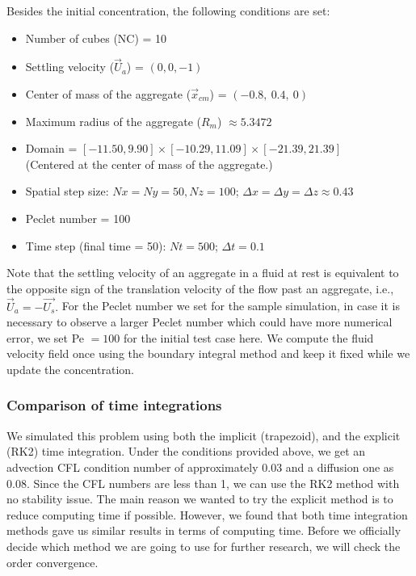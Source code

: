 Besides the initial concentration, the following conditions are set:
\begin{framed}
\begin{itemize}
	\item Number of cubes (NC) = 10
	\item Settling velocity ($\vec{U}_a$) = $(0,0,-1)$
	\item Center of mass of the aggregate ($\vec{x}_{cm}$) = $(-0.8, \  0.4, \ 0)$
	\item Maximum radius of the aggregate ($R_m$) $\approx 5.3472$
	\item Domain = $[-11.50, 9.90] \times [-10.29, 11.09] \times [-21.39, 21.39]$\\
	(Centered at the center of mass of the aggregate.)
	\item Spatial step size: $Nx = Ny = 50, Nz = 100$; $\Delta x = \Delta y = \Delta z \approx 0.43$
	\item Peclet number = 100
	\item Time step (final time = 50): $Nt = 500$; $\Delta t = 0.1$
\end{itemize}
\end{framed}
Note that the settling velocity of an aggregate in a fluid at rest is equivalent to the opposite sign of the translation velocity of the flow past an aggregate, i.e.,  $\vec{U}_a = -\vec{U_s}.$
For the Peclet number we set for the sample simulation, in case it is necessary to observe a larger Peclet number which could have more numerical error, we set Pe $=100$ for the initial test case here.
We compute the fluid velocity field once using the boundary integral method and keep it fixed while we update the concentration. 
\subsubsection{Comparison of time integrations}
We simulated this problem using both the implicit (trapezoid), and the explicit (RK2) time integration. Under the conditions provided above, we get an advection CFL condition number of approximately 0.03 and a diffusion one as 0.08. Since the CFL numbers are less than 1, we can use the RK2 method with no stability issue. 
The main reason we wanted to try the explicit method is to reduce computing time if possible. However, we found that both time integration methods gave us similar results in terms of computing time. Before we officially decide which method we are going to use for further research, we will check the order convergence.
